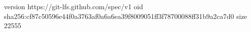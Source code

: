 version https://git-lfs.github.com/spec/v1
oid sha256:cf87c50596e44f0a3763af0a6a6ea39f8009051ff3f78700088ff31b9a2ca7d0
size 22555

